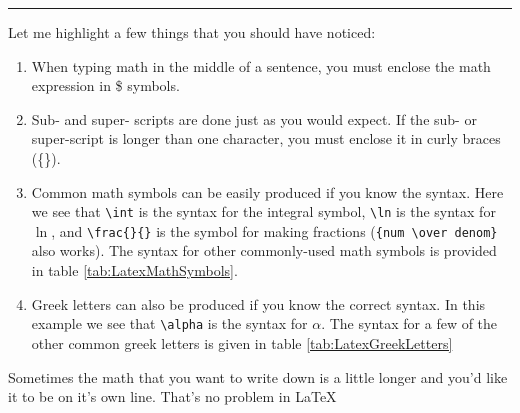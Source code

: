 \noindent\rule{5 in}{0.01 in}

\noindent Let me highlight a few things that you should have noticed:
\begin{enumerate}
\item When typing math in the middle of a sentence, you must enclose
  the math expression in \$ symbols.
\item Sub- and super- scripts are done just as you would expect.  If
  the sub- or super-script is longer than one character, you must
  enclose it in curly braces (\{\}).
\item Common math symbols can be easily produced if you know the
  syntax.  Here we see that \verb!\int! is the syntax for the integral
  symbol, \verb!\ln! is the syntax for $\ln$, and \verb!\frac{}{}! is
  the symbol for making fractions (\verb!{num \over denom}! also works).  The syntax for other commonly-used
  math symbols is provided in table \ref{tab:LatexMathSymbols}.
\item Greek letters can also be produced if you know the correct syntax.
  In this example we see that \verb!\alpha! is the syntax for
  $\alpha$.  The syntax for a few of the other common greek letters is
  given in table \ref{tab:LatexGreekLetters} 
\end{enumerate}

Sometimes the math that you want to write down is a little longer and
you'd like it to be on it's own line.  That's no problem in \LaTeX

